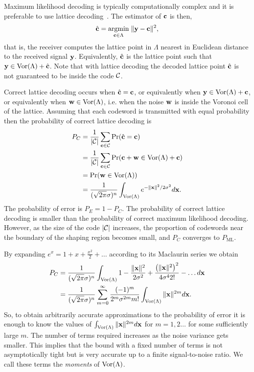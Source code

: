 \documentclass[journal]{IEEEtran}
\begin{document}
Maximum likelihood decoding is typically computationally complex and it is preferable to use lattice decoding~\cite{Agrell2002,Erex2004_lattice_decoding}.  The estimator of $\mathbf{c}$ is then,
\begin{equation}\label{eq:latticedecoder}
\hat{\cbf} = \underset{\cbf \in \Lambda}{\operatorname{argmin}}\;\| \ybf - \cbf \|^2,
\end{equation}
that is, the receiver computes the lattice point in $\Lambda$ nearest in Euclidean distance to the received signal $\mathbf{y}$.  Equivalently, $\hat{\mathbf{c}}$ is the lattice point such that $\mathbf{y} \in \operatorname{Vor}(\Lambda) + \hat{\mathbf{c}}$.  Note that with lattice decoding the decoded lattice point $\hat{\mathbf{c}}$ is not guaranteed to be inside the code $\mathcal C$.

Correct lattice decoding occurs when $\hat{\mathbf{c}} = \mathbf{c}$, or equivalently when $\mathbf{y} \in \operatorname{Vor}(\Lambda) + \mathbf{c}$, or equivalently when $\mathbf{w} \in \operatorname{Vor}(\Lambda)$, i.e. when the noise $\mathbf{w}$ is inside the Voronoi cell of the lattice.  Assuming that each codeword is transmitted with equal probability then the probability of correct lattice decoding is
\begin{align}
P_C &= \frac{1}{\abs{\calC}}\sum_{\cbf \in \calC} \prob( \hat{\cbf} = \cbf ) \nonumber \\
&= \frac{1}{\abs{\calC}}\sum_{\cbf\in \calC} \prob( \cbf + \wbf \in \vor(\Lambda) + \cbf )  \nonumber \\
&= \prob(\wbf \in \vor(\Lambda) ) \nonumber \\
&=   \frac{1}{(\sqrt{2\pi}\sigma)^n} \int_{\vor(\Lambda)}e^{-\|\xbf\|^2 / 2\sigma^2 } d\xbf. \label{eq:PEgaussian}
\end{align}
The probability of error is $P_E = 1 - P_C$.  The probability of correct lattice decoding is smaller than the probability of correct maximum likelihood decoding.  However, as the size of the code ${\left| \mathcal C \right|}$ increases, the proportion of codewords near the boundary of the shaping region becomes small, and $P_C$ converges to $P_{\text{ML}}$.

By expanding $e^x = 1  + x + \frac{x^2}{2} + \dots$ according to its Maclaurin series we obtain
\begin{align}
P_C  &= \frac{1}{(\sqrt{2\pi}\sigma)^n}\int_{\vor(\Lambda)} 1
- \frac{\|\xbf\|^2}{2\sigma^2} + \frac{\left(\|\xbf\|^2\right)^2}{
4\sigma^42!} - \dots d\xbf \nonumber \\
&= \frac{1}{(\sqrt{2\pi}\sigma)^n} \sum_{m=0}^\infty
\frac{(-1)^m}{2^m\sigma^{2m}m!} \int_{\vor(\Lambda)} \|\xbf\|^{2m}
d\xbf.  \label{eq:summomentproberror}
\end{align}
So, to obtain arbitrarily accurate approximations to the probability of error it is enough to know the values of $\int_{\operatorname{Vor}(\Lambda)} \|\mathbf{x}\|^{2m} d\mathbf{x}$ for $m=1,2\dots$ for some sufficiently large $m$.  The number of terms required increases as the noise variance gets smaller.  This implies that the bound with a fixed number of terms is not asymptotically tight but is very accurate up to a finite signal-to-noise ratio.  We call these terms the \emph{moments} of $\operatorname{Vor}(\Lambda)$.
\end{document}
